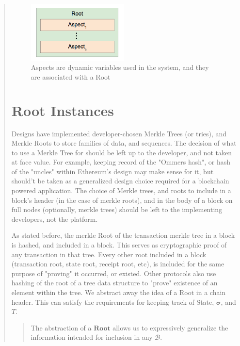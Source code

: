 \documentclass[12pt, titlepage, twocolumn]{report}
\begin{document}
\begin{quotation}
\begin{figure}[ht]
\centering
	\includegraphics[width=0.5\textwidth]{aspect_in_root}
	\caption{Aspects are dynamic variables used in the system, and they are associated with a Root}
	\label{aspect_in_root}
\end{figure}

\section{Root Instances} 
Designs have implemented developer-chosen Merkle Trees (or tries), and Merkle Roots to store families of data, and sequences. The decision of what to use a Merkle Tree for should be left up to the developer, and not taken at face value. For example, keeping record of the "Ommers hash", or hash of the "uncles" within Ethereum's design may make sense for it, but should't be taken as a generalized design choice required for a blockchain powered application. The choice of Merkle trees, and roots to include in a block's header (in the case of merkle roots), and in the body of a block on full nodes (optionally, merkle trees) should be left to the implementing developers, not the platform. 

As stated before, the merkle Root of the transaction merkle tree in a block is hashed, and included in a block. This serves as cryptographic proof of any transaction in that tree. Every other root included in a block (transaction root, state root, receipt root, etc), is included for the same purpose of "proving" it occurred, or existed. Other protocols also use hashing of the root of a tree data structure to "prove" existence of an element within the tree. We abstract away the idea of a Root in a chain header. This can satisfy the requirements for keeping track of State, \(\boldsymbol{\sigma}\), and \(T\). 


\begin{quotation}
  The abstraction of a \(\boldsymbol{Root}\) allows us to expressively generalize the information intended for inclusion in any \(\boldsymbol{\mathcal{B}}\).
 \end{quotation}


\end{quotation}
\end{document}
